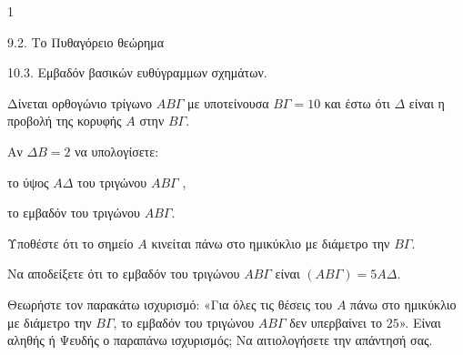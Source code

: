 \begin{ylh}{1}
    \item 9.2. Το Πυθαγόρειο θεώρημα
    \item 10.3. Εμβαδόν βασικών ευθύγραμμων σχημάτων.
\end{ylh}
\begin{figure} %
\end{figure}
Δίνεται ορθογώνιο τρίγωνο $AB\Gamma$ με υποτείνουσα $B\Gamma = 10$ και έστω ότι $\Delta$ είναι η προβολή της κορυφής $A$ στην $B\Gamma$.
\begin{alist}
    \item Αν $\Delta B = 2$ να υπολογίσετε:
    \begin{rlist}
        \item το ύψος $A\Delta$ του τριγώνου $AB\Gamma$ , 
        \item το εμβαδόν του τριγώνου $AB\Gamma$. 
    \end{rlist}
    \item Υποθέστε ότι το σημείο $A$ κινείται πάνω στο ημικύκλιο με διάμετρο την $B\Gamma$.
    \begin{rlist}
        \item Να αποδείξετε ότι το εμβαδόν του τριγώνου $AB\Gamma$ είναι $(AB\Gamma) = 5A\Delta$. 
        \item Θεωρήστε τον παρακάτω ισχυρισμό:
        «Για όλες τις θέσεις του $A$ πάνω στο ημικύκλιο με διάμετρο την $B\Gamma$, το εμβαδόν του τριγώνου $AB\Gamma$ δεν υπερβαίνει το $25$».
        Είναι αληθής ή Ψευδής ο παραπάνω ισχυρισμός; Να αιτιολογήσετε την απάντησή σας. 
    \end{rlist}
\end{alist}